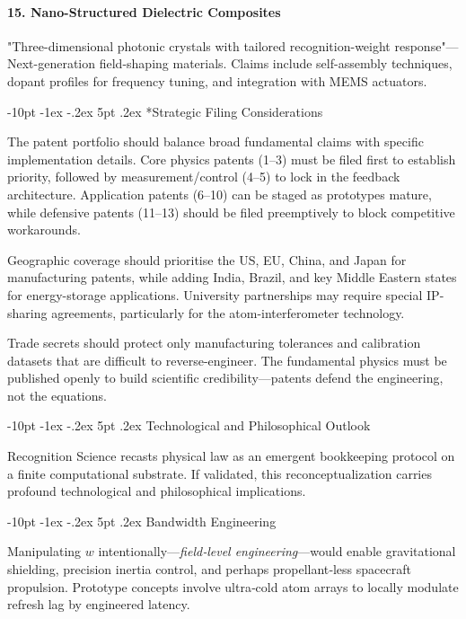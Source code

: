 \documentclass[12pt,letterpaper]{book}
\makeatletter
\renewcommand\section{\@startsection{section}{1}{\z@}%
  {-8pt \@plus -1ex \@minus -.2ex}%
  {4pt \@plus.2ex}%
  {\normalfont\large\bfseries}}
\renewcommand\section{\@startsection {section}{1}{\z@}%
                {-10pt \@plus -1ex \@minus -.2ex}%
                {5pt \@plus.2ex}%
                {\normalfont\large\bfseries}}
\makeatother
\begin{document}
\paragraph{15. Nano-Structured Dielectric Composites}
"Three-dimensional photonic crystals with tailored recognition-weight response"—Next-generation field-shaping materials.  Claims include self-assembly techniques, dopant profiles for frequency tuning, and integration with MEMS actuators.

\section*{Strategic Filing Considerations}

The patent portfolio should balance broad fundamental claims with specific implementation details.  Core physics patents (1–3) must be filed first to establish priority, followed by measurement/control (4–5) to lock in the feedback architecture.  Application patents (6–10) can be staged as prototypes mature, while defensive patents (11–13) should be filed preemptively to block competitive workarounds.

Geographic coverage should prioritise the US, EU, China, and Japan for manufacturing patents, while adding India, Brazil, and key Middle Eastern states for energy-storage applications.  University partnerships may require special IP-sharing agreements, particularly for the atom-interferometer technology.

Trade secrets should protect only manufacturing tolerances and calibration datasets that are difficult to reverse-engineer.  The fundamental physics must be published openly to build scientific credibility—patents defend the engineering, not the equations.

\section{Technological and Philosophical Outlook}

Recognition Science recasts physical law as an emergent bookkeeping protocol on a finite computational substrate.  If validated, this reconceptualization carries profound technological and philosophical implications.

\section{Bandwidth Engineering}

Manipulating $w$ intentionally—\emph{field‐level engineering}—would enable gravitational shielding, precision inertia control, and perhaps propellant‐less spacecraft propulsion.  Prototype concepts involve ultra‐cold atom arrays to locally modulate refresh lag by engineered latency.
\end{document}
